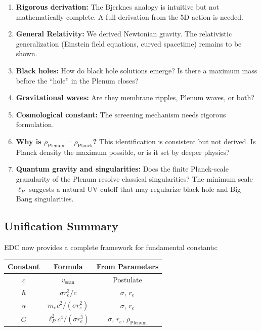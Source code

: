 \begin{enumerate}
    \item \textbf{Rigorous derivation:} The Bjerknes analogy is intuitive but not mathematically complete. A full derivation from the 5D action is needed.
    
    \item \textbf{General Relativity:} We derived Newtonian gravity. The relativistic generalization (Einstein field equations, curved spacetime) remains to be shown.
    
    \item \textbf{Black holes:} How do black hole solutions emerge? Is there a maximum mass before the ``hole'' in the Plenum closes?
    
    \item \textbf{Gravitational waves:} Are they membrane ripples, Plenum waves, or both?
    
    \item \textbf{Cosmological constant:} The screening mechanism needs rigorous formulation.
    
    \item \textbf{Why is $\rho_{\text{Plenum}} = \rho_{\text{Planck}}$?} This identification is consistent but not derived. Is Planck density the maximum possible, or is it set by deeper physics?
    
    \item \textbf{Quantum gravity and singularities:} Does the finite Planck-scale granularity of the Plenum resolve classical singularities? The minimum scale $\ell_P$ suggests a natural UV cutoff that may regularize black hole and Big Bang singularities.
\end{enumerate}

\subsection{Unification Summary}

EDC now provides a complete framework for fundamental constants:

\begin{center}
\begin{tabular}{|c|c|c|}
\hline
\textbf{Constant} & \textbf{Formula} & \textbf{From Parameters} \\
\hline
$c$ & $v_{\text{scan}}$ & Postulate \\
$\hbar$ & $\sigma r_e^3 / c$ & $\sigma$, $r_e$ \\
$\alpha$ & $m_e c^2 / (\sigma r_e^2)$ & $\sigma$, $r_e$ \\
$G$ & $\ell_P^2 c^4 / (\sigma r_e^3)$ & $\sigma$, $r_e$, $\rho_{\text{Plenum}}$ \\
\hline
\end{tabular}
\end{center}

